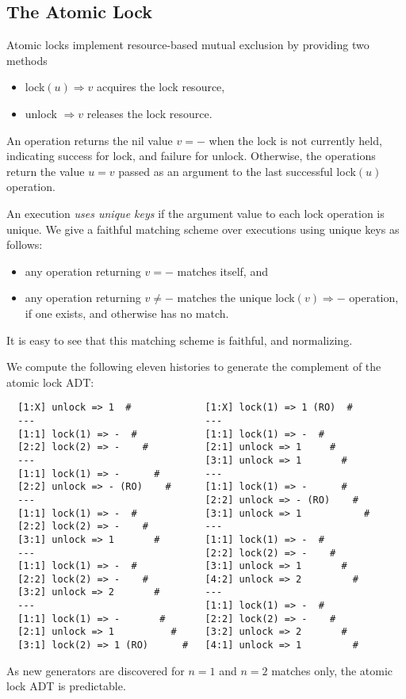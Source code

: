 \subsection{The Atomic Lock}

Atomic locks implement resource-based mutual exclusion by providing two
methods
\begin{itemize}

  \item lock$(u) \Rightarrow v$ acquires the lock resource,

  \item unlock $\Rightarrow v$ releases the lock resource.

\end{itemize}
An operation returns the nil value $v = -$ when the lock is not
currently held, indicating success for lock, and failure for unlock. Otherwise,
the operations return the value $u = v$ passed as an argument to the last
successful lock$(u)$ operation.

An execution \emph{uses unique keys} if the argument value to each lock
operation is unique. We give a faithful matching scheme over executions using
unique keys as follows:
\begin{itemize}

  \item any operation returning $v = -$ matches itself, and

  \item any operation returning $v \neq -$ matches the unique
  lock$(v) \Rightarrow -$ operation, if one exists, and otherwise
  has no match.

\end{itemize}
It is easy to see that this matching scheme is faithful, and normalizing.

We compute the following eleven histories to generate the complement of the
atomic lock ADT:
\begin{verbatim}
  [1:X] unlock => 1  #             [1:X] lock(1) => 1 (RO)  #
  ---                              ---
  [1:1] lock(1) => -  #            [1:1] lock(1) => -  #
  [2:2] lock(2) => -    #          [2:1] unlock => 1     #
  ---                              [3:1] unlock => 1       #
  [1:1] lock(1) => -      #        ---
  [2:2] unlock => - (RO)    #      [1:1] lock(1) => -      #
  ---                              [2:2] unlock => - (RO)    #
  [1:1] lock(1) => -  #            [3:1] unlock => 1           #
  [2:2] lock(2) => -    #          ---
  [3:1] unlock => 1       #        [1:1] lock(1) => -  #
  ---                              [2:2] lock(2) => -    #
  [1:1] lock(1) => -  #            [3:1] unlock => 1       #
  [2:2] lock(2) => -    #          [4:2] unlock => 2         #
  [3:2] unlock => 2       #        ---
  ---                              [1:1] lock(1) => -  #
  [1:1] lock(1) => -       #       [2:2] lock(2) => -    #
  [2:1] unlock => 1          #     [3:2] unlock => 2       #
  [3:1] lock(2) => 1 (RO)      #   [4:1] unlock => 1         #
\end{verbatim}
As new generators are discovered for $n=1$ and $n=2$ matches only, the atomic
lock ADT is predictable.

